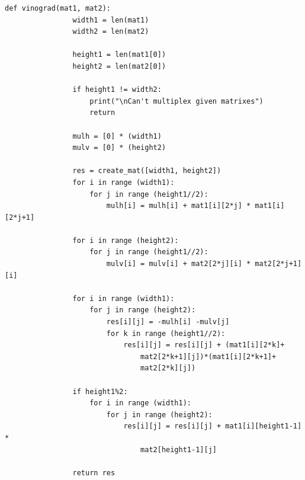 \documentclass[a4paper,12pt]{report}
\begin{document}
	    \begin{lstlisting}[frame = single, breaklines, caption = Алгоритм Винограда, label=list:wino] 
	        def vinograd(mat1, mat2):
	        	width1 = len(mat1)
	        	width2 = len(mat2)
	        
	        	height1 = len(mat1[0])
	        	height2 = len(mat2[0])
	        
	        	if height1 != width2:
	        		print("\nCan't multiplex given matrixes")
	        		return
	        
	        	mulh = [0] * (width1)
	        	mulv = [0] * (height2)
	        
	        	res = create_mat([width1, height2])
	        	for i in range (width1):
	        		for j in range (height1//2):
	        			mulh[i] = mulh[i] + mat1[i][2*j] * mat1[i][2*j+1]
	        
	        	for i in range (height2):
	        		for j in range (height1//2):
	        			mulv[i] = mulv[i] + mat2[2*j][i] * mat2[2*j+1][i]
	        
	        	for i in range (width1):
	        		for j in range (height2):
	        			res[i][j] = -mulh[i] -mulv[j]
	        			for k in range (height1//2):
	        				res[i][j] = res[i][j] + (mat1[i][2*k]+
	        					mat2[2*k+1][j])*(mat1[i][2*k+1]+
	        					mat2[2*k][j])
	        
	        	if height1%2:
	        		for i in range (width1):
	        			for j in range (height2):
	        				res[i][j] = res[i][j] + mat1[i][height1-1] *
	        					mat2[height1-1][j]
	        
	        	return res
	    \end{lstlisting}
	        
\end{document}
